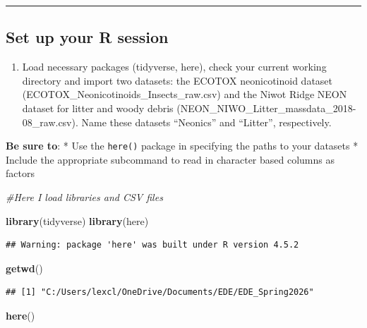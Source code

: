 \documentclass[
]{article}
\newenvironment{Shaded}{\begin{snugshade}}{\end{snugshade}}
\newcommand{\CommentTok}[1]{\textcolor[rgb]{0.56,0.35,0.01}{\textit{#1}}}
\newcommand{\FunctionTok}[1]{\textcolor[rgb]{0.13,0.29,0.53}{\textbf{#1}}}
\newcommand{\NormalTok}[1]{#1}
\providecommand{\tightlist}{%
  \setlength{\itemsep}{0pt}\setlength{\parskip}{0pt}}
\begin{document}
\begin{center}\rule{0.5\linewidth}{0.5pt}\end{center}

\subsection{Set up your R session}\label{set-up-your-r-session}

\begin{enumerate}
\def\labelenumi{\arabic{enumi}.}
\tightlist
\item
  Load necessary packages (tidyverse, here), check your current working
  directory and import two datasets: the ECOTOX neonicotinoid dataset
  (ECOTOX\_Neonicotinoids\_Insects\_raw.csv) and the Niwot Ridge NEON
  dataset for litter and woody debris
  (NEON\_NIWO\_Litter\_massdata\_2018-08\_raw.csv). Name these datasets
  ``Neonics'' and ``Litter'', respectively.
\end{enumerate}

\textbf{Be sure to}: * Use the \texttt{here()} package in specifying the
paths to your datasets * Include the appropriate subcommand to read in
character based columns as factors

\begin{Shaded}
\begin{Highlighting}[]
\CommentTok{\#Here I load libraries and CSV files}

\FunctionTok{library}\NormalTok{(tidyverse)}
\FunctionTok{library}\NormalTok{(here)}
\end{Highlighting}
\end{Shaded}

\begin{verbatim}
## Warning: package 'here' was built under R version 4.5.2
\end{verbatim}

\begin{Shaded}
\begin{Highlighting}[]
\FunctionTok{getwd}\NormalTok{()}
\end{Highlighting}
\end{Shaded}

\begin{verbatim}
## [1] "C:/Users/lexcl/OneDrive/Documents/EDE/EDE_Spring2026"
\end{verbatim}

\begin{Shaded}
\begin{Highlighting}[]
\FunctionTok{here}\NormalTok{()}
\end{Highlighting}
\end{Shaded}
\end{document}
